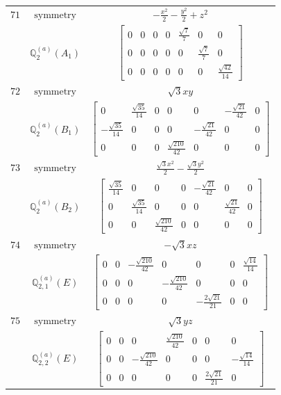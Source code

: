 \documentclass[fleqn,8pt,landscape]{jsarticle}
\begin{document}
\begin{longtable}{ccc}
$ 71 $ & $ \text{symmetry} $ & $ - \frac{x^{2}}{2} - \frac{y^{2}}{2} + z^{2} $ \\
$  $ & $ \mathbb{Q}_{2}^{(a)}(A_{1}) $ & $ \begin{bmatrix} 0 & 0 & 0 & 0 & \frac{\sqrt{7}}{7} & 0 & 0 \\ 0 & 0 & 0 & 0 & 0 & \frac{\sqrt{7}}{7} & 0 \\ 0 & 0 & 0 & 0 & 0 & 0 & \frac{\sqrt{42}}{14} \end{bmatrix} $ \\ \hline
$ 72 $ & $ \text{symmetry} $ & $ \sqrt{3} x y $ \\
$  $ & $ \mathbb{Q}_{2}^{(a)}(B_{1}) $ & $ \begin{bmatrix} 0 & \frac{\sqrt{35}}{14} & 0 & 0 & 0 & - \frac{\sqrt{21}}{42} & 0 \\ - \frac{\sqrt{35}}{14} & 0 & 0 & 0 & - \frac{\sqrt{21}}{42} & 0 & 0 \\ 0 & 0 & 0 & \frac{\sqrt{210}}{42} & 0 & 0 & 0 \end{bmatrix} $ \\ \hline
$ 73 $ & $ \text{symmetry} $ & $ \frac{\sqrt{3} x^{2}}{2} - \frac{\sqrt{3} y^{2}}{2} $ \\
$  $ & $ \mathbb{Q}_{2}^{(a)}(B_{2}) $ & $ \begin{bmatrix} \frac{\sqrt{35}}{14} & 0 & 0 & 0 & - \frac{\sqrt{21}}{42} & 0 & 0 \\ 0 & \frac{\sqrt{35}}{14} & 0 & 0 & 0 & \frac{\sqrt{21}}{42} & 0 \\ 0 & 0 & \frac{\sqrt{210}}{42} & 0 & 0 & 0 & 0 \end{bmatrix} $ \\ \hline
$ 74 $ & $ \text{symmetry} $ & $ - \sqrt{3} x z $ \\
$  $ & $ \mathbb{Q}_{2,1}^{(a)}(E) $ & $ \begin{bmatrix} 0 & 0 & - \frac{\sqrt{210}}{42} & 0 & 0 & 0 & \frac{\sqrt{14}}{14} \\ 0 & 0 & 0 & - \frac{\sqrt{210}}{42} & 0 & 0 & 0 \\ 0 & 0 & 0 & 0 & - \frac{2 \sqrt{21}}{21} & 0 & 0 \end{bmatrix} $ \\ \hline
$ 75 $ & $ \text{symmetry} $ & $ \sqrt{3} y z $ \\
$  $ & $ \mathbb{Q}_{2,2}^{(a)}(E) $ & $ \begin{bmatrix} 0 & 0 & 0 & \frac{\sqrt{210}}{42} & 0 & 0 & 0 \\ 0 & 0 & - \frac{\sqrt{210}}{42} & 0 & 0 & 0 & - \frac{\sqrt{14}}{14} \\ 0 & 0 & 0 & 0 & 0 & \frac{2 \sqrt{21}}{21} & 0 \end{bmatrix} $ \\ \hline

\end{longtable}
\end{document}
